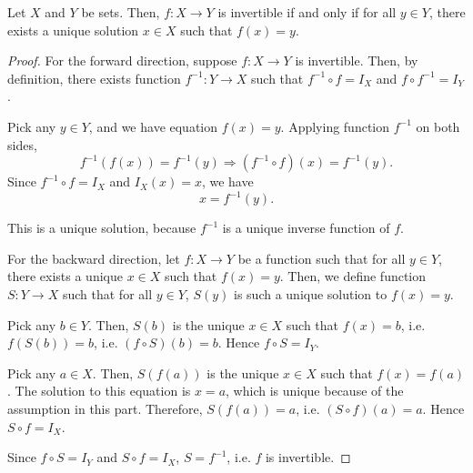 \documentclass[]{book}
\newcommand{\inv}[1]{\ensuremath{{#1}^{-1}}}
\begin{document}
\begin{theorem}
    \label{thm: invertibility implies unique solution}
    Let $X$ and $Y$ be sets. Then, $f:X \to Y$ is invertible if and only if for all $y \in Y$, there exists a unique solution $x \in X$ such that $f(x)=y$.
\begin{proof}
    For the forward direction, suppose $f:X \to Y$ is invertible. Then, by definition, there exists function $\inv{f}:Y \to X$ such that $\inv{f} \circ f = I_X$ and $f \circ \inv{f} = I_Y$.
    
    Pick any $y \in Y$, and we have equation $f(x)=y$. Applying function $\inv{f}$ on both sides,
    \[\inv{f}(f(x)) = \inv{f}(y) \Longrightarrow (\inv{f} \circ f)(x) = \inv{f}(y).\]
    Since $\inv{f} \circ f = I_X$ and $I_X(x) = x$, we have
    \[x = \inv{f}(y).\]
    
    This is a unique solution, because $\inv{f}$ is a unique inverse function of $f$.
    
    For the backward direction, let $f:X \to Y$ be a function such that for all $y \in Y$, there exists a unique $x \in X$ such that $f(x)=y$. Then, we define function $S: Y \to X$ such that for all $y \in Y$, $S(y)$ is such a unique solution to $f(x)=y$. 
    
    Pick any $b \in Y$. Then, $S(b)$ is the unique $x \in X$ such that $f(x)=b$, i.e. $f(S(b)) = b$, i.e. $(f \circ S)(b) = b$. Hence $f \circ S = I_Y$.
    
    Pick any $a \in X$. Then, $S(f(a))$ is the unique $x \in X$ such that $f(x)=f(a)$. The solution to this equation is $x=a$, which is unique because of the assumption in this part. Therefore, $S(f(a)) = a$, i.e. $(S \circ f)(a) = a$. Hence $S \circ f = I_X$.
    
    Since $f \circ S = I_Y$ and $S \circ f = I_X$, $S = \inv{f}$, i.e. $f$ is invertible.
\end{proof}
\end{theorem}
\end{document}
